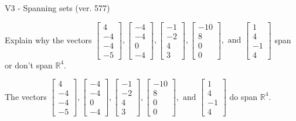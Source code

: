\begin{exercise}
  \begin{exerciseTitle}V3 - Spanning sets (ver. 577)\end{exerciseTitle}
  \begin{exerciseStatement}
    Explain why the vectors \(\left[\begin{array}{r}
4 \\
-4 \\
-4 \\
-5
\end{array}\right] , \left[\begin{array}{r}
-4 \\
-4 \\
0 \\
-4
\end{array}\right] , \left[\begin{array}{r}
-1 \\
-2 \\
4 \\
3
\end{array}\right] , \left[\begin{array}{r}
-10 \\
8 \\
0 \\
0
\end{array}\right] , \text{ and } \left[\begin{array}{r}
1 \\
4 \\
-1 \\
4
\end{array}\right]\) span or don't span \(\mathbb{R}^4\). 
	


  \end{exerciseStatement}
  \begin{exerciseAnswer}
   The vectors \(\left[\begin{array}{r}
4 \\
-4 \\
-4 \\
-5
\end{array}\right] , \left[\begin{array}{r}
-4 \\
-4 \\
0 \\
-4
\end{array}\right] , \left[\begin{array}{r}
-1 \\
-2 \\
4 \\
3
\end{array}\right] , \left[\begin{array}{r}
-10 \\
8 \\
0 \\
0
\end{array}\right] , \text{ and } \left[\begin{array}{r}
1 \\
4 \\
-1 \\
4
\end{array}\right]\) 
  	 do  
	span \(\mathbb{R}^4\).
  



\end{exerciseAnswer}
\end{exercise}
